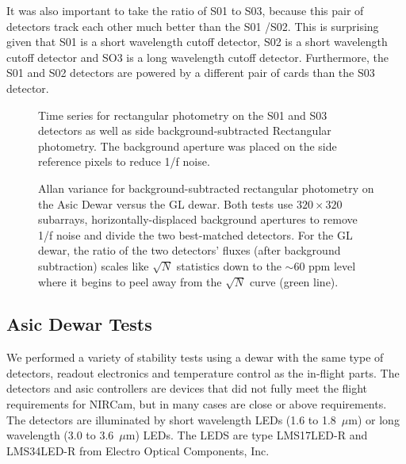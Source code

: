 \documentclass{aastex62}
\begin{document}
It was also important to take the ratio of S01 to S03, because this pair of detectors track each other much better than the S01 /S02.
This is surprising given that S01 is a short wavelength cutoff detector, S02 is a short wavelength cutoff detector and SO3 is a long wavelength cutoff detector.
Furthermore, the S01 and S02 detectors are powered by a different pair of cards than the S03 detector.


\begin{figure}
\caption{Time series for rectangular photometry on the S01 and S03 detectors as well as side background-subtracted Rectangular photometry.
The background aperture was placed on the side reference pixels to reduce 1/f noise.}\label{fig:GLtSeriesRun112sub6}
\end{figure}

\begin{figure}
\caption{Allan variance for background-subtracted rectangular photometry on the Asic Dewar versus the GL dewar.
Both tests use $320 \times 320$ subarrays, horizontally-displaced background apertures to remove 1/f noise and divide the two best-matched detectors.
For the GL dewar, the ratio of the two detectors' fluxes (after background subtraction) scales like $\sqrt{N}$ statistics down to the $\sim$60 ppm level where it begins to peel away from the $\sqrt{N}$ curve (green line).}\label{fig:GLAllanVarianceAcrossDetectorsSub6}
\end{figure}

\clearpage
\subsection{Asic Dewar Tests}
We performed a variety of stability tests using a dewar with the same type of detectors, readout electronics and temperature control as the in-flight parts.
The detectors and asic controllers are devices that did not fully meet the flight requirements for NIRCam, but in many cases are close or above requirements.
The detectors are illuminated by short wavelength LEDs (1.6 to 1.8~$\mu$m) or long wavelength (3.0 to 3.6~$\mu$m) LEDs.
The LEDS are type LMS17LED-R and LMS34LED-R from Electro Optical Components, Inc.
\end{document}
